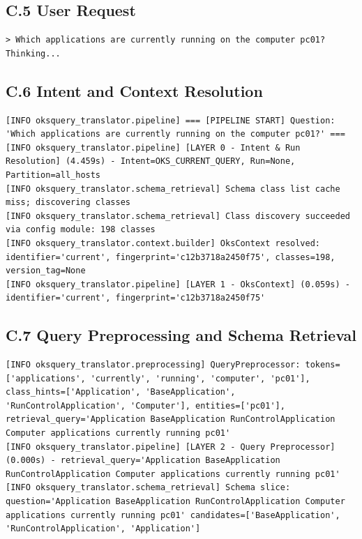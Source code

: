 \documentclass[12pt, a4paper]{report}
\begin{document}
\subsection*{C.5 User Request}
\begin{lstlisting}
> Which applications are currently running on the computer pc01?
Thinking...
\end{lstlisting}

\subsection*{C.6 Intent and Context Resolution}
\begin{lstlisting}
[INFO oksquery_translator.pipeline] === [PIPELINE START] Question: 'Which applications are currently running on the computer pc01?' ===
[INFO oksquery_translator.pipeline] [LAYER 0 - Intent & Run Resolution] (4.459s) - Intent=OKS_CURRENT_QUERY, Run=None, Partition=all_hosts
[INFO oksquery_translator.schema_retrieval] Schema class list cache miss; discovering classes
[INFO oksquery_translator.schema_retrieval] Class discovery succeeded via config module: 198 classes
[INFO oksquery_translator.context.builder] OksContext resolved: identifier='current', fingerprint='c12b3718a2450f75', classes=198, version_tag=None
[INFO oksquery_translator.pipeline] [LAYER 1 - OksContext] (0.059s) - identifier='current', fingerprint='c12b3718a2450f75'
\end{lstlisting}

\subsection*{C.7 Query Preprocessing and Schema Retrieval}
\begin{lstlisting}
[INFO oksquery_translator.preprocessing] QueryPreprocessor: tokens=['applications', 'currently', 'running', 'computer', 'pc01'], class_hints=['Application', 'BaseApplication', 'RunControlApplication', 'Computer'], entities=['pc01'], retrieval_query='Application BaseApplication RunControlApplication Computer applications currently running pc01'
[INFO oksquery_translator.pipeline] [LAYER 2 - Query Preprocessor] (0.000s) - retrieval_query='Application BaseApplication RunControlApplication Computer applications currently running pc01'
[INFO oksquery_translator.schema_retrieval] Schema slice: question='Application BaseApplication RunControlApplication Computer applications currently running pc01' candidates=['BaseApplication', 'RunControlApplication', 'Application']
\end{lstlisting}
\end{document}
